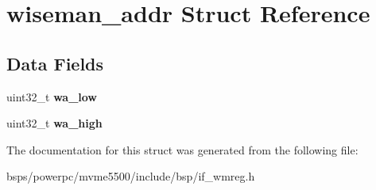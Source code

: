 \hypertarget{structwiseman__addr}{}\section{wiseman\+\_\+addr Struct Reference}
\label{structwiseman__addr}
\subsection*{Data Fields}
\begin{DoxyCompactItemize}
\item 
\mbox{\label{structwiseman__addr_a754f0e30aecd7a0759accb7307322038}} 
uint32\+\_\+t {\bfseries wa\+\_\+low}
\item 
\mbox{\label{structwiseman__addr_a74789c0e35bec2e442ca67a921545897}} 
uint32\+\_\+t {\bfseries wa\+\_\+high}
\end{DoxyCompactItemize}


The documentation for this struct was generated from the following file\+:\begin{DoxyCompactItemize}
\item 
bsps/powerpc/mvme5500/include/bsp/if\+\_\+wmreg.\+h\end{DoxyCompactItemize}
